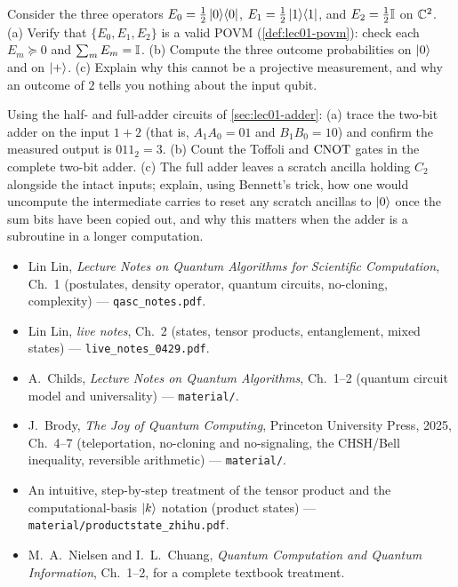 \begin{exercise}\label{ex:lec01-15}
Consider the three operators
$E_{0}=\tfrac12\ket{0}\!\bra{0}$, $E_{1}=\tfrac12\ket{1}\!\bra{1}$, and $E_{2}=\tfrac12\mathbb{I}$ on $\mathbb{C}^{2}$.
(a) Verify that $\{E_{0},E_{1},E_{2}\}$ is a valid POVM (\cref{def:lec01-povm}): check
each $E_{m}\succeq0$ and $\sum_{m}E_{m}=\mathbb{I}$. (b) Compute the three outcome
probabilities on $\ket{0}$ and on $\ket{+}$. (c) Explain why this cannot be a
projective measurement, and why an outcome of $2$ tells you nothing about the input
qubit.
\end{exercise}

\begin{exercise}\label{ex:lec01-adder}
Using the half- and full-adder circuits of \cref{sec:lec01-adder}: (a) trace the
two-bit adder on the input $1+2$ (that is, $A_1A_0=01$ and $B_1B_0=10$) and confirm
the measured output is $011_2=3$. (b) Count the Toffoli and $\mathrm{CNOT}$ gates in the
complete two-bit adder. (c) The full adder leaves a scratch ancilla holding $C_2$
alongside the intact inputs; explain, using Bennett's trick, how one would
uncompute the intermediate carries to reset any scratch ancillas to $\ket{0}$ once
the sum bits have been copied out, and why this matters when the adder is a
subroutine in a longer computation.
\end{exercise}

\readingsection
\begin{itemize}[leftmargin=1.4em]
  \item Lin Lin, \emph{Lecture Notes on Quantum Algorithms for Scientific
        Computation}, Ch.~1 (postulates, density operator, quantum circuits,
        no-cloning, complexity) --- \texttt{qasc\_notes.pdf}.
  \item Lin Lin, \emph{live notes}, Ch.~2 (states, tensor products, entanglement,
        mixed states) --- \texttt{live\_notes\_0429.pdf}.
  \item A.~Childs, \emph{Lecture Notes on Quantum Algorithms}, Ch.~1--2 (quantum
        circuit model and universality) --- \texttt{material/}.
  \item J.~Brody, \emph{The Joy of Quantum Computing}, Princeton University Press,
        2025, Ch.~4--7 (teleportation, no-cloning and no-signaling, the CHSH/Bell
        inequality, reversible arithmetic) --- \texttt{material/}.
  \item An intuitive, step-by-step treatment of the tensor product and the
        computational-basis $\ket{k}$ notation (product states) ---
        \texttt{material/productstate\_zhihu.pdf}.
  \item M.~A.~Nielsen and I.~L.~Chuang, \emph{Quantum Computation and Quantum
        Information}, Ch.~1--2, for a complete textbook treatment.
\end{itemize}
